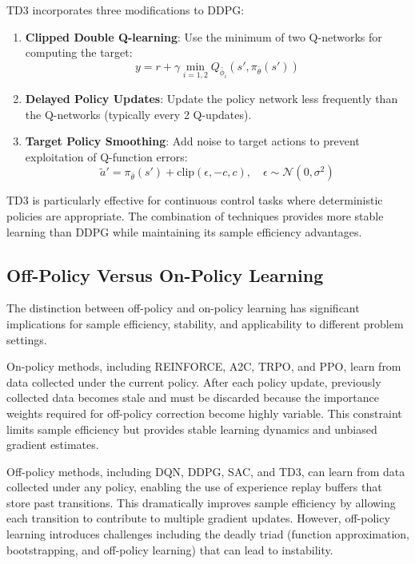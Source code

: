 \begin{definition}[TD3 Modifications]
\label{def:td3}
TD3 incorporates three modifications to DDPG:
\begin{enumerate}
\item \textbf{Clipped Double Q-learning}: Use the minimum of two Q-networks for computing the target:
\begin{equation}
y = r + \gamma \min_{i=1,2} Q_{\bar{\phi}_i}(s', \pi_{\bar{\theta}}(s'))
\end{equation}
\item \textbf{Delayed Policy Updates}: Update the policy network less frequently than the Q-networks (typically every 2 Q-updates).
\item \textbf{Target Policy Smoothing}: Add noise to target actions to prevent exploitation of Q-function errors:
\begin{equation}
\tilde{a}' = \pi_{\bar{\theta}}(s') + \text{clip}(\epsilon, -c, c), \quad \epsilon \sim \mathcal{N}(0, \sigma^2)
\end{equation}
\end{enumerate}
\end{definition}

TD3 is particularly effective for continuous control tasks where deterministic policies are appropriate. The combination of techniques provides more stable learning than DDPG while maintaining its sample efficiency advantages.

\subsection{Off-Policy Versus On-Policy Learning}
\label{subsec:off_on_policy}

The distinction between off-policy and on-policy learning has significant implications for sample efficiency, stability, and applicability to different problem settings.

On-policy methods, including REINFORCE, A2C, TRPO, and PPO, learn from data collected under the current policy. After each policy update, previously collected data becomes stale and must be discarded because the importance weights required for off-policy correction become highly variable. This constraint limits sample efficiency but provides stable learning dynamics and unbiased gradient estimates.

Off-policy methods, including DQN, DDPG, SAC, and TD3, can learn from data collected under any policy, enabling the use of experience replay buffers that store past transitions. This dramatically improves sample efficiency by allowing each transition to contribute to multiple gradient updates. However, off-policy learning introduces challenges including the deadly triad (function approximation, bootstrapping, and off-policy learning) that can lead to instability.

